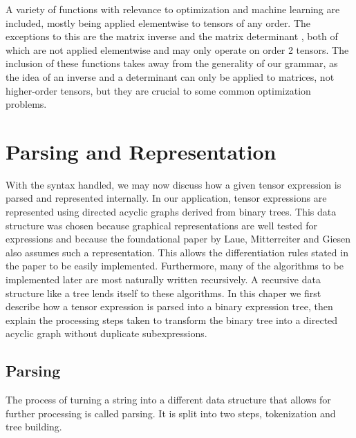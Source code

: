 \documentclass[12pt, a4paper]{report}
\begin{document}
A variety of functions with relevance to optimization and machine learning are included, mostly being applied elementwise to tensors of any order.
The exceptions to this are the matrix inverse  and the matrix determinant , both of which are not applied elementwise and may only operate on order 2 tensors.
The inclusion of these functions takes away from the generality of our grammar, as the idea of an inverse and a determinant can only be applied to matrices, not higher-order tensors, but they are crucial to some common optimization problems.

\chapter{Parsing and Representation}
With the syntax handled, we may now discuss how a given tensor expression is parsed and represented internally.
In our application, tensor expressions are represented using directed acyclic graphs derived from binary trees.
This data structure was chosen because graphical representations are well tested for expressions and because the foundational paper by Laue, Mitterreiter and Giesen also assumes such a representation.
This allows the differentiation rules stated in the paper to be easily implemented.
Furthermore, many of the algorithms to be implemented later are most naturally written recursively.
A recursive data structure like a tree lends itself to these algorithms.
In this chaper we first describe how a tensor expression is parsed into a binary expression tree, then explain the processing steps taken to transform the binary tree into a directed acyclic graph without duplicate subexpressions.

\section{Parsing}
The process of turning a string into a different data structure that allows for further processing is called parsing.
It is split into two steps, tokenization and tree building.
\end{document}
